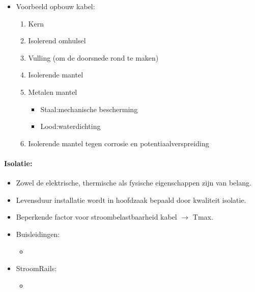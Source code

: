 \documentclass[12pt]{article}
\begin{document}
\begin{itemize}
    \item Voorbeeld opbouw kabel:\begin{enumerate}
        \item Kern 
        \item Isolerend omhulsel 
        \item Vulling (om de doorsnede rond te maken)
        \item Isolerende mantel 
        \item Metalen mantel\begin{itemize}
            \item Staal:mechanische bescherming
            \item Lood:waterdichting
        \end{itemize}
        \item Isolerende mantel tegen corrosie en potentiaalverspreiding
    \end{enumerate}
\end{itemize}
\paragraph{Isolatie:}
\begin{itemize}
    \item Zowel de elektrische, thermische als fysische eigenschappen zijn van belang.
    \item Levensduur installatie wordt in hoofdzaak bepaald door kwaliteit isolatie.
    \item Beperkende factor voor stroombelastbaarheid kabel $\rightarrow$ Tmax.
\end{itemize}
\begin{itemize}
    \item Buisleidingen:\begin{itemize}
        \item 
    \end{itemize}
    \item StroomRails:\begin{itemize}
        \item 
    \end{itemize}
\end{itemize}
\end{document}
